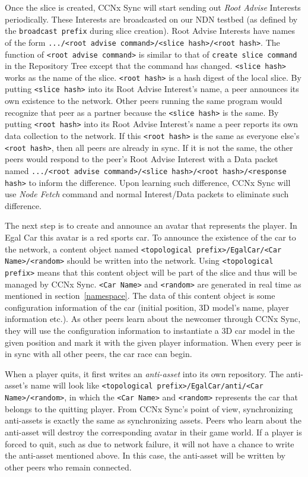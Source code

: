 \documentclass{article}
\begin{document}
Once the slice is created, CCNx Sync will start sending out \emph{Root Advise} Interests periodically. These Interests are broadcasted on our NDN testbed (as defined by the \texttt{broadcast prefix} during slice creation). Root Advise Interests have names of the form \texttt{.../<root advise command>/<slice hash>/<root hash>}. The function of \texttt{<root advise command>} is similar to that of \texttt{create slice command} in the Repository Tree except that the command has changed. \texttt{<slice hash>} works as the name of the slice. \texttt{<root hash>} is a hash digest of the local slice. By putting \texttt{<slice hash>} into its Root Advise Interest's name, a peer announces its own existence to the network. Other peers running the same program would recognize that peer as a partner because the \texttt{<slice hash>} is the same. By putting \texttt{<root hash>} into its Root Advise Interest's name a peer reports its own data collection to the network. If this \texttt{<root hash>} is the same as everyone else's \texttt{<root hash>}, then all peers are already in sync. If it is not the same, the other peers would respond to the peer's Root Advise Interest with a Data packet named \texttt{.../<root advise command>/<slice hash>/<root hash>/<response hash>} to inform the difference. Upon learning such difference, CCNx Sync will use \emph{Node Fetch} command and normal Interest/Data packets to eliminate such difference.

The next step is to create and announce an avatar that represents the player. In Egal Car this avatar is a red sports car. To announce the existence of the car to the network, a content object named \texttt{<topological prefix>/EgalCar/<Car Name>/<random>} should be written into the network. Using \texttt{<topological prefix>} means that this content object will be part of the slice and thus will be managed by CCNx Sync. \texttt{<Car Name>} and \texttt{<random>} are generated in real time as mentioned in section~\ref{namespace}. The data of this content object is some configuration information of the car (initial position, 3D model's name, player information etc.). As other peers learn about the newcomer through CCNx Sync, they will use the configuration information to instantiate a 3D car model in the given position and mark it with the given player information. When every peer is in sync with all other peers, the car race can begin.

When a player quits, it first writes an \emph{anti-asset} into its own repository. The anti-asset's name will look like \texttt{<topological prefix>/EgalCar/anti/<Car Name>/<random>}, in which the \texttt{<Car Name>} and \texttt{<random>} represents the car that belongs to the quitting player. From CCNx Sync's point of view, synchronizing anti-assets is exactly the same as synchronizing assets. Peers who learn about the anti-asset will destroy the corresponding avatar in their game world. If a player is forced to quit, such as due to network failure, it will not have a chance to write the anti-asset mentioned above. In this case, the anti-asset will be written by other peers who remain connected. 
\end{document}

